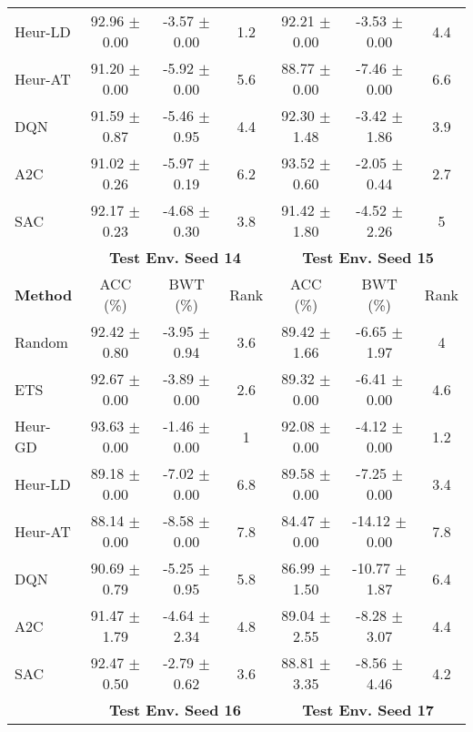 \begin{tabular}{lcccccc}
	Heur-LD         & 92.96 $\pm$ 0.00    & -3.57 $\pm$ 0.00    & 1.2    & 92.21 $\pm$ 0.00    & -3.53 $\pm$ 0.00    & 4.4    \\
	Heur-AT         & 91.20 $\pm$ 0.00    & -5.92 $\pm$ 0.00    & 5.6    & 88.77 $\pm$ 0.00    & -7.46 $\pm$ 0.00    & 6.6    \\
	DQN             & 91.59 $\pm$ 0.87    & -5.46 $\pm$ 0.95    & 4.4    & 92.30 $\pm$ 1.48    & -3.42 $\pm$ 1.86    & 3.9    \\
	A2C             & 91.02 $\pm$ 0.26    & -5.97 $\pm$ 0.19    & 6.2    & 93.52 $\pm$ 0.60    & -2.05 $\pm$ 0.44    & 2.7    \\
	SAC             & 92.17 $\pm$ 0.23    & -4.68 $\pm$ 0.30    & 3.8    & 91.42 $\pm$ 1.80    & -4.52 $\pm$ 2.26    & 5      \\
	\midrule 
	& \multicolumn{3}{c}{\textbf{Test Env. Seed 14}} & \multicolumn{3}{c}{\textbf{Test Env. Seed 15}} \\
	\cmidrule(lr){2-4} \cmidrule(lr){5-7}
	\textbf{Method} & ACC (\%)          & BWT (\%)          & Rank   & ACC (\%)          & BWT (\%)          & Rank   \\
	\midrule 
	Random          & 92.42 $\pm$ 0.80    & -3.95 $\pm$ 0.94    & 3.6    & 89.42 $\pm$ 1.66    & -6.65 $\pm$ 1.97    & 4      \\
	ETS             & 92.67 $\pm$ 0.00    & -3.89 $\pm$ 0.00    & 2.6    & 89.32 $\pm$ 0.00    & -6.41 $\pm$ 0.00    & 4.6    \\
	Heur-GD         & 93.63 $\pm$ 0.00    & -1.46 $\pm$ 0.00    & 1      & 92.08 $\pm$ 0.00    & -4.12 $\pm$ 0.00    & 1.2    \\
	Heur-LD         & 89.18 $\pm$ 0.00    & -7.02 $\pm$ 0.00    & 6.8    & 89.58 $\pm$ 0.00    & -7.25 $\pm$ 0.00    & 3.4    \\
	Heur-AT         & 88.14 $\pm$ 0.00    & -8.58 $\pm$ 0.00    & 7.8    & 84.47 $\pm$ 0.00    & -14.12 $\pm$ 0.00   & 7.8    \\
	DQN             & 90.69 $\pm$ 0.79    & -5.25 $\pm$ 0.95    & 5.8    & 86.99 $\pm$ 1.50    & -10.77 $\pm$ 1.87   & 6.4    \\
	A2C             & 91.47 $\pm$ 1.79    & -4.64 $\pm$ 2.34    & 4.8    & 89.04 $\pm$ 2.55    & -8.28 $\pm$ 3.07    & 4.4    \\
	SAC             & 92.47 $\pm$ 0.50    & -2.79 $\pm$ 0.62    & 3.6    & 88.81 $\pm$ 3.35    & -8.56 $\pm$ 4.46    & 4.2    \\
	\midrule 
	& \multicolumn{3}{c}{\textbf{Test Env. Seed 16}} & \multicolumn{3}{c}{\textbf{Test Env. Seed 17}} \\

\end{tabular}
